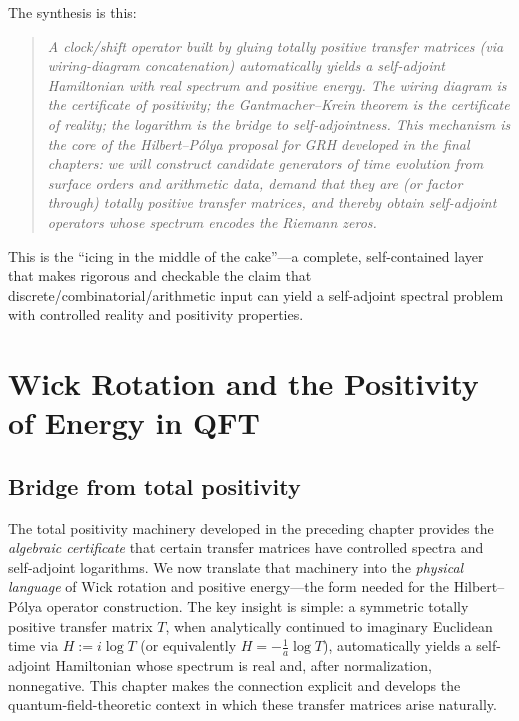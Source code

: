 \documentclass[11pt,oneside]{amsbook}
\numberwithin{equation}{section}
\theoremstyle{plain}
\theoremstyle{definition}
\theoremstyle{remark}
\begin{document}
The synthesis is this:
\begin{quote}
\emph{A clock/shift operator built by gluing totally positive transfer matrices (via wiring-diagram concatenation) automatically yields a self-adjoint Hamiltonian with real spectrum and positive energy.
The wiring diagram is the certificate of positivity; the Gantmacher--Krein theorem is the certificate of reality; the logarithm is the bridge to self-adjointness.
This mechanism is the core of the Hilbert--Pólya proposal for GRH developed in the final chapters:
we will construct candidate generators of time evolution from surface orders and arithmetic data, demand that they are (or factor through) totally positive transfer matrices, and thereby obtain self-adjoint operators whose spectrum encodes the Riemann zeros.}
\end{quote}

This is the ``icing in the middle of the cake''—a complete, self-contained layer that makes rigorous and checkable the claim that discrete/combinatorial/arithmetic input can yield a self-adjoint spectral problem with controlled reality and positivity properties.



					
					
\chapter{Wick Rotation and the Positivity of Energy in QFT}
\label{ch:wick_rotation_positive_energy}

\section*{Bridge from total positivity}

The total positivity machinery developed in the preceding chapter provides the \emph{algebraic certificate} that certain transfer matrices have controlled spectra and self-adjoint logarithms.
We now translate that machinery into the \emph{physical language} of Wick rotation and positive energy—the form needed for the Hilbert--Pólya operator construction.
The key insight is simple: a symmetric totally positive transfer matrix $T$, when analytically continued to imaginary Euclidean time via $H:=i\log T$ (or equivalently $H=-\frac{1}{a}\log T$), automatically yields a self-adjoint Hamiltonian whose spectrum is real and, after normalization, nonnegative.
This chapter makes the connection explicit and develops the quantum-field-theoretic context in which these transfer matrices arise naturally.
\end{document}
